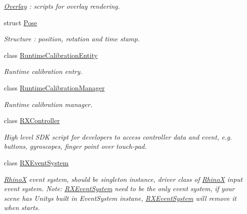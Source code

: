 \begin{DoxyCompactItemize}
\begin{DoxyCompactList}\small\item\em \mbox{\hyperlink{class_ximmerse_1_1_rhino_x_1_1_overlay}{Overlay}} \+: scripts for overlay rendering. \end{DoxyCompactList}\item 
struct \mbox{\hyperlink{struct_ximmerse_1_1_rhino_x_1_1_pose}{Pose}}
\begin{DoxyCompactList}\small\item\em Structure \+: position, rotation and time stamp. \end{DoxyCompactList}\item 
class \mbox{\hyperlink{class_ximmerse_1_1_rhino_x_1_1_runtime_calibration_entity}{Runtime\+Calibration\+Entity}}
\begin{DoxyCompactList}\small\item\em Runtime calibration entry. \end{DoxyCompactList}\item 
class \mbox{\hyperlink{class_ximmerse_1_1_rhino_x_1_1_runtime_calibration_manager}{Runtime\+Calibration\+Manager}}
\begin{DoxyCompactList}\small\item\em Runtime calibration manager. \end{DoxyCompactList}\item 
class \mbox{\hyperlink{class_ximmerse_1_1_rhino_x_1_1_r_x_controller}{R\+X\+Controller}}
\begin{DoxyCompactList}\small\item\em High level S\+DK script for developers to access controller data and event, e.\+g. buttons, gyroscopes, finger point over touch-\/pad. \end{DoxyCompactList}\item 
class \mbox{\hyperlink{class_ximmerse_1_1_rhino_x_1_1_r_x_event_system}{R\+X\+Event\+System}}
\begin{DoxyCompactList}\small\item\em \mbox{\hyperlink{namespace_ximmerse_1_1_rhino_x}{RhinoX}} event system, should be singleton instance, driver class of \mbox{\hyperlink{namespace_ximmerse_1_1_rhino_x}{RhinoX}} input event system. Note\+: \mbox{\hyperlink{class_ximmerse_1_1_rhino_x_1_1_r_x_event_system}{R\+X\+Event\+System}} need to be the only event system, if your scene has Unity\textquotesingle{}s built in Event\+System instane, \mbox{\hyperlink{class_ximmerse_1_1_rhino_x_1_1_r_x_event_system}{R\+X\+Event\+System}} will remove it when starts. \end{DoxyCompactList}\item 

\end{DoxyCompactItemize}
